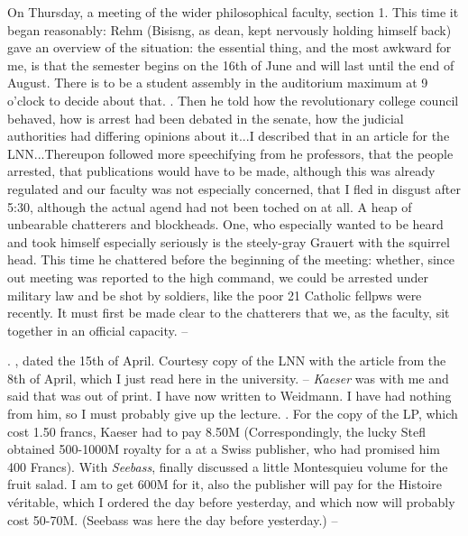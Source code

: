 
\missing On Thursday, a meeting of the wider philosophical faculty, section 1. This time it began reasonably: Rehm (Bisisng, as dean, kept nervously holding himself back) gave an overview of the situation: the essential thing, and the most awkward for me, is that the semester begins on the 16th of June and will last until the end of August. There is to be a student assembly in the auditorium maximum at 9 o'clock to decide about that. . Then he told how the revolutionary college council behaved, how is arrest had been debated in the senate, how the judicial authorities had differing opinions about it...I described that in an article for the LNN...Thereupon followed more speechifying from he professors, that the people arrested, that publications would have to be made, although this was already regulated and our faculty was not especially concerned, that I fled in disgust after 5:30, although the actual agend had not been toched on at all. A heap of unbearable chatterers and blockheads. One, who especially wanted to be heard and took himself especially seriously is the  steely-gray Grauert with the squirrel head. This time he chattered before the beginning of the meeting: whether, since out meeting was reported to the high command, we could be arrested under military law and be shot by  soldiers, like the poor 21 Catholic fellpws were recently. It must first be made clear to the chatterers that we, as the faculty, sit together in an official capacity. --

. , dated the 15th of April. Courtesy copy of the LNN with the article from the 8th of April, which I just read here in the university. -- \textit{Kaeser} was with me and said that  was out of print. I have now written to Weidmann. I have had nothing from him, so I must probably give up the lecture. . For the copy of the LP, which cost 1.50 francs, Kaeser had to pay 8.50M (Correspondingly, the lucky Stefl obtained 500-1000M royalty for a  at a Swiss publisher, who had promised him 400 Francs). With \textit{Seebass}, finally discussed a little Montesquieu volume for the fruit salad. I am to get 600M for it, also the publisher will pay for the Histoire véritable, which I ordered the day before yesterday, and which now will probably cost 50-70M. (Seebass was here the day before yesterday.) --

